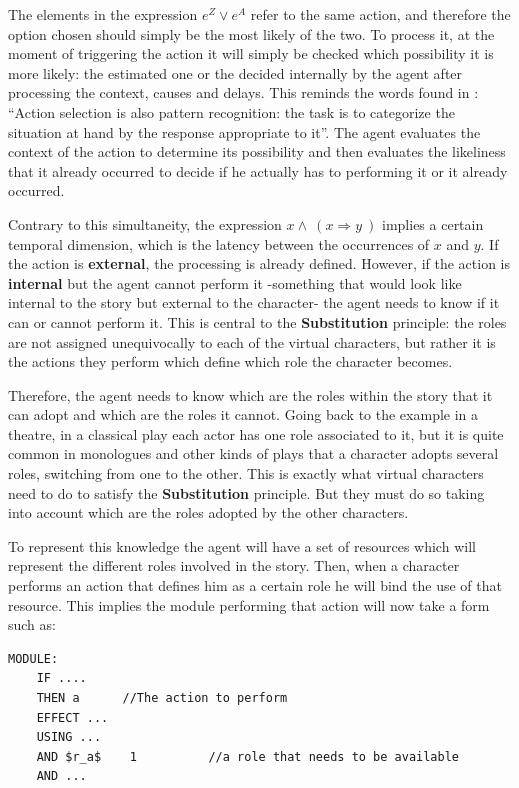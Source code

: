 \documentclass[
		twoside,openright,titlepage,numbers=noenddot,manychapters,
		headinclude,%
                footinclude=false,cleardoublepage=empty,
                BCOR=5mm,
		fontsize=11pt, %
                 enabledeprecatedfontcommands]{scrreprt}
\begin{document}
The elements in the expression $e^Z \vee  e^{A} $ refer to the same action, and therefore the option chosen should simply be the most likely of the two. To process it, at the moment of triggering the action it will simply be checked which possibility it is more likely: the estimated one or the decided internally by the agent after processing the context, causes and delays.
This reminds the words found in \cite[chapter 8]{goetz1998arb}: ``Action selection is also pattern recognition: the task is to categorize the situation at hand by the response appropriate to it''. The agent evaluates the context of the action to determine its possibility and then evaluates the likeliness that it already occurred to decide if he actually has to performing it or it already occurred.


Contrary to this simultaneity, the expression $x \wedge \ ( x \Rightarrow y \ )$ implies a certain temporal dimension, which is the latency between the occurrences of $x$ and $y$. If the action is \textbf{external}, the processing is already defined. However, if the action is \textbf{internal} but the agent cannot perform it -something that would look like internal to the story but external to the character-  the agent needs to know if it can or cannot perform it. This is central to the \textbf{Substitution} principle: the roles are not assigned unequivocally to each of the virtual characters, but rather it is the actions they perform which define which role the character becomes.

Therefore, the agent needs to know which are the roles within the story that it can adopt and which are the roles it cannot. Going back to the example in a theatre, in a classical play each actor has one role associated to it, but it is quite common in monologues and other kinds of plays that a character adopts several roles, switching from one to the other. This is exactly what virtual characters need to do to satisfy the \textbf{Substitution} principle. But they must do so taking into account which are the roles adopted by the other characters. 
 
To represent this knowledge the agent will have a set of resources which will represent the different roles involved in the story. Then, when a character performs an action that defines him as a certain role he will bind the use of that resource. This implies the module performing that action will now take a form such as:
\begin{lstlisting}[mathescape]
MODULE:				 
	IF ....				
	THEN a 		//The action to perform
	EFFECT ... 			
	USING ...			
	AND $r_a$	 1			//a role that needs to be available
	AND ...
\end{lstlisting}
\end{document}
